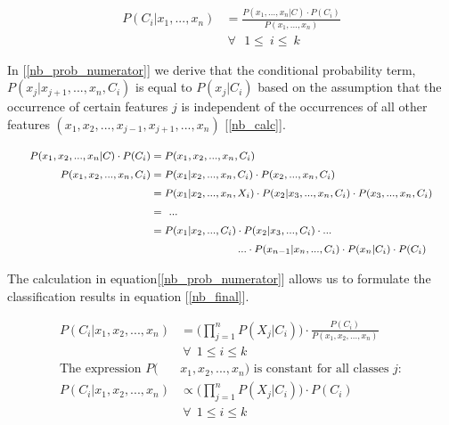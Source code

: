 	\begin{equation}
		\begin{aligned}
			P(C_i|x_1, ... , x_n) &= \frac{P(x_1, ... , x_n |C) \cdot P(C_i)}{P(x_1, ... ,x_n)} \\
			& \ \forall \ \ \  1 \leq \ i \leq \ k
		\end{aligned}
		\label{nb_post_prob}
	\end{equation}
	
		In [\ref{nb_prob_numerator}] we derive that the conditional probability term, $ P(x_j|x_{j+1}, ...,x_n,C_i) $ is equal to $ P(x_j|C_i) $ based on the assumption that the occurrence of certain features $ j $ is independent of the occurrences of all other features $ (x_1,x_2,..., x_{j-1},x_{j+1}, ...,x_n) $ [\ref{nb_calc}].
	
	\begin{equation}
		\begingroup\makeatletter\def\f@size{8}\check@mathfonts
			\begin{aligned}
				P(x_1,x_2, ..., x_n |C) \cdot P(C_i) &= P(x_1,x_2,...,x_n,C_i) \\
				P(x_1,x_2, ..., x_n,C_i) &= P(x_1|x_2, ...,x_n,C_i) \cdot P(x_2, ...,x_n,C_i) \\
				&= P(x_1|x_2, ...,x_n,X_i) \cdot P(x_2|x_3, ..., x_n, C_i) \cdot P(x_3, ..., x_n,C_i) \\
				&= \ ... \\
				&= P(x_1|x_2, ...,C_i) \cdot P(x_2|x_3, ...,C_i) \cdot ... \\
				& \ \ \ \ \ \ \ \ \ \ \ \ \ \ \ \ \ \ \ \ \ 
				... \cdot P(x_{n-1}|x_n, ...,C_i) \cdot P(x_n|C_i) \cdot P(C_i)
			\end{aligned}
		\endgroup
		\label{nb_prob_numerator}
	\end{equation}
	
		The calculation in equation[\ref{nb_prob_numerator}] allows us to formulate the classification results in equation [\ref{nb_final}].
	
	\begin{equation}
		\begin{aligned}
			P(C_i|x_1,x_2, ...,x_n) &= \Bigg(
			\prod_{j=1}^n  P(X_j|C_i)
			\Bigg) \cdot
			\frac{P(C_i)}{P(x_1,x_2, ..., x_n)}\\ 
			&\ \forall \ \  1 \leq i \leq k \\
			\text{The expression } P(&x_1,x_2, ...,x_n)\text{ is constant for all classes } j: \\
			P(C_i|x_1,x_2, ...,x_n)& \propto \Bigg(
			\prod_{j=1}^n  P(X_j|C_i)
			\Bigg) \cdot P(C_i) \\
			&\ \forall \ \  1 \leq i \leq k 
		\end{aligned}
		\label{nb_final}
	\end{equation}
	
